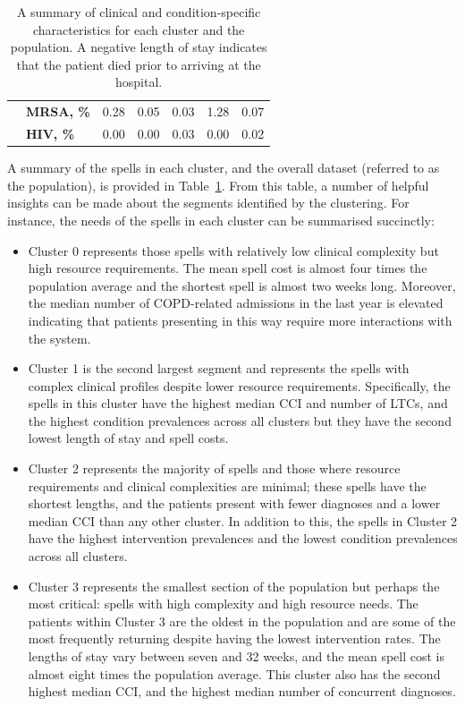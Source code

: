 \documentclass[11pt]{article}
\begin{document}
\begin{table}
{\begin{tabular}{llrrrrr}
               & \textbf{MRSA, \%} &     0.28 &     0.05 &     0.03 &      1.28 &       0.07 \\
               & \textbf{HIV, \%} &     0.00 &     0.00 &     0.03 &      0.00 &       0.02 \\
        \bottomrule
        \end{tabular}
    }\caption{%
        A summary of clinical and condition-specific characteristics for each
        cluster and the population. A negative length of stay indicates that the
        patient died prior to arriving at the hospital.
    }\label{tab:summary}
\end{table}

A summary of the spells in each cluster, and the overall dataset (referred to as
the population), is provided in Table~\ref{tab:summary}. From this table, a
number of helpful insights can be made about the segments identified by the
clustering. For instance, the needs of the spells in each cluster can be
summarised succinctly:
\begin{itemize}
    \item Cluster 0 represents those spells with relatively low clinical
        complexity but high resource requirements. The mean spell cost is almost
        four times the population average and the shortest spell is almost two
        weeks long. Moreover, the median number of COPD-related admissions in
        the last year is elevated indicating that patients presenting in this
        way require more interactions with the system.
    \item Cluster 1 is the second largest segment and represents the spells with
        complex clinical profiles despite lower resource requirements.
        Specifically, the spells in this cluster have the highest median CCI and
        number of LTCs, and the highest condition prevalences across all
        clusters but they have the second lowest length of stay and spell costs.
    \item Cluster 2 represents the majority of spells and those where resource
        requirements and clinical complexities are minimal; these spells have
        the shortest lengths, and the patients present with fewer diagnoses and
        a lower median CCI than any other cluster. In addition to this, the
        spells in Cluster 2 have the highest intervention prevalences and the
        lowest condition prevalences across all clusters.
    \item Cluster 3 represents the smallest section of the population but
        perhaps the most critical: spells with high complexity and high resource
        needs. The patients within Cluster 3 are the oldest in the population
        and are some of the most frequently returning despite having the lowest
        intervention rates. The lengths of stay vary between seven and 32 weeks,
        and the mean spell cost is almost eight times the population average.
        This cluster also has the second highest median CCI, and the highest
        median number of concurrent diagnoses.
\end{itemize}
\end{document}
